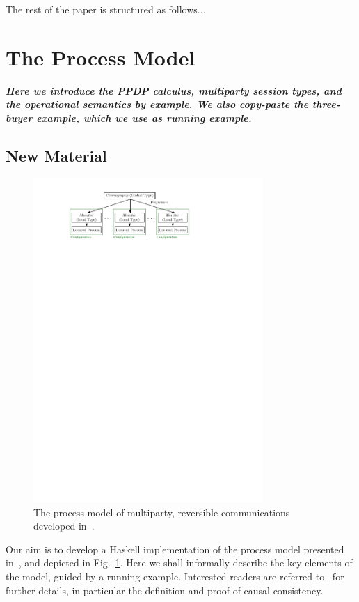 \documentclass[runningheads,plain]{llncs}
\begin{document}
The rest of the paper is structured as follows...

\section{The Process Model}
\label{the-process-model}
\textbf{\emph{Here we introduce the PPDP calculus, multiparty session types, and the operational semantics by example. We also copy-paste the three-buyer example, which we use as running example.}}

\subsection{New Material}
\begin{figure}
\begin{center}
    \includegraphics[width=8.7cm]{./img/figmodel.pdf}
\end{center}
\vspace{-4mm}
\caption{The process model of multiparty, reversible communications developed in~\cite{DBLP:conf/ppdp/MezzinaP17}.}\label{f:model}
\end{figure}

Our aim is to develop a Haskell implementation of the process model presented in~\cite{DBLP:conf/ppdp/MezzinaP17}, and depicted in Fig.~\ref{f:model}. 
Here we shall  informally describe the key elements of the model, guided by a running example. Interested readers are referred to~\cite{DBLP:conf/ppdp/MezzinaP17} for further details, in particular the definition and proof of causal consistency. 
\end{document}
